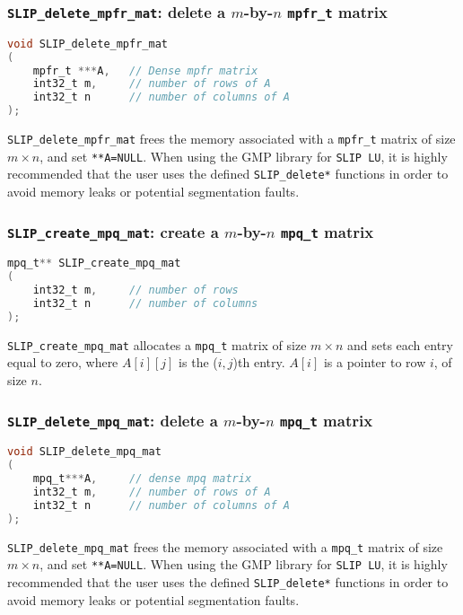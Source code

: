 \documentclass[11pt]{article}
\theoremstyle{definition}
\begin{document}
\cprotect\subsubsection{\verb|SLIP_delete_mpfr_mat|: delete a $m$-by-$n$ \verb|mpfr_t| matrix}


\begin{lstlisting}[language=C,frame=single]
void SLIP_delete_mpfr_mat
(
    mpfr_t ***A,   // Dense mpfr matrix
    int32_t m,     // number of rows of A
    int32_t n      // number of columns of A
);
\end{lstlisting}

\verb|SLIP_delete_mpfr_mat| frees the memory associated with a \verb|mpfr_t| matrix of size $m \times n$, and set \verb|**A=NULL|. When using the GMP library for \verb|SLIP LU|, it is highly recommended that the user uses the defined \verb|SLIP_delete*| functions in order to avoid memory leaks or potential segmentation faults.

\cprotect\subsubsection{\verb|SLIP_create_mpq_mat|: create a $m$-by-$n$ \verb|mpq_t| matrix}
\label{ss:create_mpq_mat}


\begin{lstlisting}[language=C,frame=single]
mpq_t** SLIP_create_mpq_mat
(
    int32_t m,     // number of rows
    int32_t n      // number of columns
);
\end{lstlisting}

\verb|SLIP_create_mpq_mat| allocates a \verb|mpq_t| matrix of size $m \times n$ and sets each entry equal to zero, where $A[i][j]$ is the ($i,j$)th entry. $A[i]$ is a pointer to row $i$, of size $n$.

\cprotect\subsubsection{\verb|SLIP_delete_mpq_mat|: delete a $m$-by-$n$ \verb|mpq_t| matrix}


\begin{lstlisting}[language=C,frame=single]
void SLIP_delete_mpq_mat
(
    mpq_t***A,     // dense mpq matrix
    int32_t m,     // number of rows of A
    int32_t n      // number of columns of A
);
\end{lstlisting}

\verb|SLIP_delete_mpq_mat| frees the memory associated with a \verb|mpq_t| matrix of size $m \times n$, and set \verb|**A=NULL|. When using the GMP library for \verb|SLIP LU|, it is highly recommended that the user uses the defined \verb|SLIP_delete*| functions in order to avoid memory leaks or potential segmentation faults.
\end{document}
